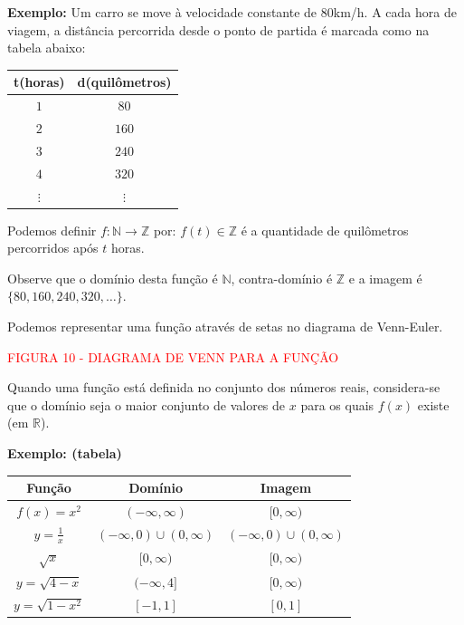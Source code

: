 \documentclass[oneside,a4paper,12pt]{article}
\begin{document}
\textbf{Exemplo: } Um carro se move à velocidade constante de $80$km/h. A cada hora de viagem, a distância percorrida desde o ponto de partida é marcada como na tabela abaixo:
\begin{table}[h]
	\centering
	\begin{tabular}{|c|c|}
		\hline
		t(horas)	&	d(quilômetros) \\
		\hline
		$1$			&	$80$	\\
		\hline
		$2$			&	$160$	\\
		\hline
		$3$			&	$240$	\\
		\hline
		$4$			&	$320$	\\
		\hline
		$\vdots$		&	$\vdots$	\\
		\hline	
	\end{tabular}
\end{table}
	
Podemos definir $f:\mathbb{N} \rightarrow \mathbb{Z}$ por: $f(t) \in \mathbb{Z}$ é a quantidade de quilômetros percorridos após $t$ horas.

Observe que o domínio desta função é $\mathbb{N}$, contra-domínio é $\mathbb{Z}$ e a imagem é $\{80,160,240,320,\dots\}$.

Podemos representar uma função através de setas no diagrama de Venn-Euler.


\vspace{90pt}

\begin{center}
	\textcolor{red}{FIGURA 10 - DIAGRAMA DE VENN PARA A FUNÇÃO}
\end{center}
	
Quando uma função está definida no conjunto dos números reais, considera-se que o domínio seja o maior conjunto de valores de $x$ para os quais $f(x)$ existe (em $\mathbb{R}$).

\textbf{Exemplo: (tabela)}	

\begin{table}[h!]
	\centering
	\begin{tabular}{|c|c|c|}
		\hline
		Função		&	Domínio					&	Imagem	\\
		\hline
		$f(x)=x^2$	&	$(-\infty, \infty)$		&	$[0, \infty)$	\\
		\hline
		$y=\frac{1}{x}$	&	$(-\infty,0) \cup (0,\infty)$	& $(-\infty,0) \cup (0,\infty)$	\\
		\hline
		$\sqrt{x}$	&	$[0,\infty)$			&	$[0,\infty)$	\\
		\hline
		$y=\sqrt{4-x}$	&	$(-\infty,4]$		&	$[0,\infty)$	\\
		\hline
		$y=\sqrt{1-x^2}$&	$[-1,1]$			&	$[0,1]$	\\
		\hline		
	\end{tabular}
\end{table}
	
\end{document}

